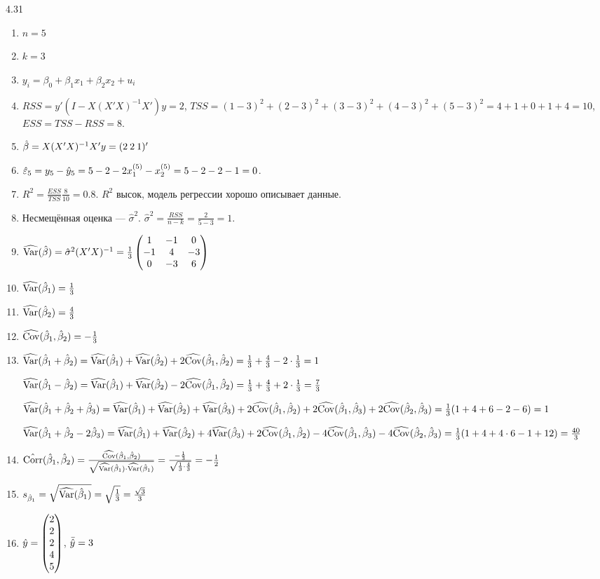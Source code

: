 \begin{solution}{{4.31}}

\begin{enumerate}
\item $n=5$
\item $k=3$
\item $y_i=\beta_0+\beta_1x_1+\beta_2x_2+u_i$
\item $RSS=y'(I-X(X'X)^{-1}X')y=2$, $TSS=(1-3)^2+(2-3)^2+(3-3)^2+(4-3)^2+(5-3)^2=4+1+0+1+4=10$, $ESS=TSS-RSS=8$.
\item $\hat{\beta}=X(X'X)^{-1}X'y=(2\>2\>1)'$
\item $\hat{\varepsilon}_5=y_5-\hat{y}_5=5-2-2x^{(5)}_1-x^{(5)}_2=5-2-2-1=0$.
\item $R^2=\frac{ESS}{TSS}\frac{8}{10}=0.8$. $R^2$ высок, модель регрессии хорошо описывает данные.
\item Несмещённая оценка — $\hat\sigma^2$. $\hat\sigma^2=\frac{RSS}{n-k}=\frac{2}{5-3}=1$.
\item $\widehat{\operatorname{Var}}(\hat{\beta})=\hat\sigma^2(X'X)^{-1}=\frac13\begin{pmatrix}
1&-1&0\\
-1&4&-3\\
0&-3&6
\end{pmatrix}
$
\item $\widehat{\operatorname{Var}}(\hat\beta_1)=\frac13$
\item $\widehat{\operatorname{Var}}(\hat\beta_2)=\frac43$
\item $\widehat{\operatorname{Cov}}(\hat\beta_1,\hat\beta_2)=-\frac13$
\item $\widehat{\operatorname{Var}}(\hat\beta_1+\hat\beta_2)=\widehat{\operatorname{Var}}(\hat\beta_1)+\widehat{\operatorname{Var}}(\hat\beta_2)+2\widehat{\operatorname{Cov}}(\hat\beta_1,\hat\beta_2)=\frac13+\frac43-2\cdot\frac13=1$

$\widehat{\operatorname{Var}}(\hat\beta_1-\hat\beta_2)=\widehat{\operatorname{Var}}(\hat\beta_1)+\widehat{\operatorname{Var}}(\hat\beta_2)-2\widehat{\operatorname{Cov}}(\hat\beta_1,\hat\beta_2)=\frac13+\frac43+2\cdot\frac13=\frac73$

$\widehat{\operatorname{Var}}(\hat\beta_1+\hat\beta_2+\hat\beta_3)=\widehat{\operatorname{Var}}(\hat\beta_1)+\widehat{\operatorname{Var}}(\hat\beta_2)+\widehat{\operatorname{Var}}(\hat\beta_3)+2\widehat{\operatorname{Cov}}(\hat\beta_1,\hat\beta_2)+2\widehat{\operatorname{Cov}}(\hat\beta_1,\hat\beta_3)+2\widehat{\operatorname{Cov}}(\hat\beta_2,\hat\beta_3)=\frac13(1+4+6-2-6)=1$

$\widehat{\operatorname{Var}}(\hat\beta_1+\hat\beta_2-2\hat\beta_3)=\widehat{\operatorname{Var}}(\hat\beta_1)+\widehat{\operatorname{Var}}(\hat\beta_2)+4\widehat{\operatorname{Var}}(\hat\beta_3)+2\widehat{\operatorname{Cov}}(\hat\beta_1,\hat\beta_2)-4\widehat{\operatorname{Cov}}(\hat\beta_1,\hat\beta_3)-4\widehat{\operatorname{Cov}}(\hat\beta_2,\hat\beta_3)=\frac13(1+4+4\cdot 6-1+12)=\frac{40}{3}$
\item $\hat{\operatorname{Corr}}(\hat\beta_1,\hat\beta_2)=\frac{\widehat{\operatorname{Cov}}(\hat\beta_1,\hat\beta_2)}{\sqrt{\widehat{\operatorname{Var}}(\hat\beta_1)\cdot\widehat{\operatorname{Var}}(\hat\beta_1)}}=\frac{-\frac13}{\sqrt{\frac13\cdot\frac43}}=-\frac12$
\item $s_{\hat\beta_1}=\sqrt{\widehat{\operatorname{Var}}(\hat\beta_1)}=\sqrt{\frac13}=\frac{\sqrt3}{3}$
\item $\hat{y}=\begin{pmatrix}
2\\
2\\
2\\
4\\
5
\end{pmatrix}$, $\bar {\hat{y}}=3$


\end{enumerate}
\end{solution}
